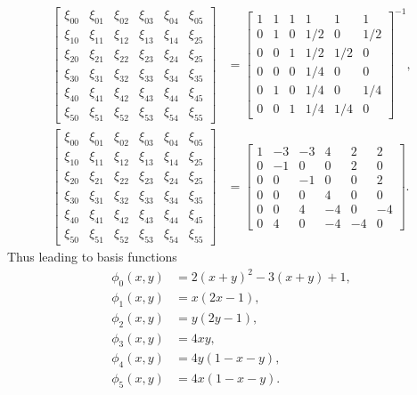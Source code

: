 \documentclass[12pt]{ociamthesis}
\begin{document}
\begin{align}
\left[ \begin{matrix}
\xi_{00} & \xi_{01} & \xi_{02} & \xi_{03} & \xi_{04} & \xi_{05}\\
\xi_{10} & \xi_{11} & \xi_{12} & \xi_{13} & \xi_{14} & \xi_{25}\\
\xi_{20} & \xi_{21} & \xi_{22} & \xi_{23} & \xi_{24} & \xi_{25}\\
\xi_{30} & \xi_{31} & \xi_{32} & \xi_{33} & \xi_{34} & \xi_{35}\\
\xi_{40} & \xi_{41} & \xi_{42} & \xi_{43} & \xi_{44} & \xi_{45}\\
\xi_{50} & \xi_{51} & \xi_{52} & \xi_{53} & \xi_{54} & \xi_{55}
\end{matrix} \right] &= 
\left[ \begin{matrix}
1 & 1 & 1 & 1 & 1 & 1\\
0 & 1 & 0 & 1/2 & 0 & 1/2\\
0 & 0 & 1 & 1/2 & 1/2 & 0\\
0 & 0 & 0 & 1/4 & 0 & 0\\
0 & 1 & 0 & 1/4 & 0 & 1/4\\
0 & 0 & 1 & 1/4 & 1/4 & 0
\end{matrix} \right]^{-1}, \\
\left[ \begin{matrix}
\xi_{00} & \xi_{01} & \xi_{02} & \xi_{03} & \xi_{04} & \xi_{05}\\
\xi_{10} & \xi_{11} & \xi_{12} & \xi_{13} & \xi_{14} & \xi_{25}\\
\xi_{20} & \xi_{21} & \xi_{22} & \xi_{23} & \xi_{24} & \xi_{25}\\
\xi_{30} & \xi_{31} & \xi_{32} & \xi_{33} & \xi_{34} & \xi_{35}\\
\xi_{40} & \xi_{41} & \xi_{42} & \xi_{43} & \xi_{44} & \xi_{45}\\
\xi_{50} & \xi_{51} & \xi_{52} & \xi_{53} & \xi_{54} & \xi_{55}
\end{matrix} \right] &= 
\left[ \begin{matrix}
1 & -3 & -3 & 4 & 2 & 2\\
0 & -1 & 0 & 0 & 2 & 0\\
0 & 0 & -1 & 0 & 0 & 2\\
0 & 0 & 0 & 4 & 0 & 0\\
0 & 0 & 4 & -4 & 0 & -4\\
0 & 4 & 0 & -4 & -4 & 0
\end{matrix} \right].
\end{align}
Thus leading to basis functions
\begin{align}
\phi_0(x,y) &= 2(x+y)^2 - 3(x+y) + 1, \\
\phi_1(x,y) &= x(2x-1), \\
\phi_2(x,y) &= y(2y-1), \\
\phi_3(x,y) &= 4xy, \\
\phi_4(x,y) &= 4y(1-x-y), \\
\phi_5(x,y) &= 4x(1-x-y).
\end{align}
\end{document}
